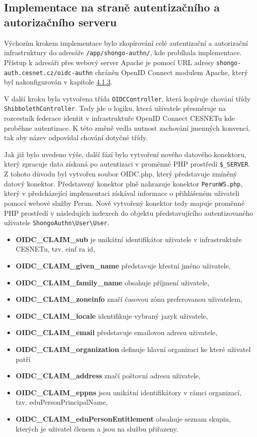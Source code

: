 \documentclass[
  printed, %
  twoside, %
  table,   %
  nolof,     %
  nolot,     %
]{fithesis3}
\begin{document}
\subsection{Implementace na straně autentizačního a autorizačního serveru}
\label{ShongoImpl-authn}
Výchozím krokem implementace bylo zkopírování celé autentizační a autorizační infrastruktury do adresáře \texttt{/app/shongo-authn/}, kde probíhala implementace. Přístup k adresáři přes webový server Apache je pomocí URL adresy \texttt{shongo-auth.cesnet.cz/oidc-authn} chráněn OpenID Connect modulem Apache, který byl nakonfigurován v kapitole \hyperref[shongo-location]{4.1.3}.  \par

V další kroku byla vytvořena třída \texttt{OIDCController}, která kopíruje chování třídy \texttt{ShibbolethController}. Tedy jde o logiku, která uživatele přesměruje na rozcestník federace identit v infrastruktuře OpenID Connect CESNETu kde proběhne autentizace. K této změně vedla nutnost zachování jmenných konvencí, tak aby název odpovídal chování dotyčné třídy.  \par 

Jak již bylo uvedeno výše, další fází bylo vytvoření nového datového konektoru, který zpracuje data získaná po autentizaci v proměnné PHP prostředí \texttt{\$\_SERVER}. Z tohoto důvodu byl vytvořen soubor OIDC.php, který představuje zmíněný datový konektor. Představený konektor plně nahrazuje konektor \texttt{PerunWS.php}, který v předcházející implementaci získával informace o přihlášeném uživateli pomocí webové služby Perun. Nově vytvořený konektor tedy mapuje proměnné PHP prostředí v následujích indexech do objektu představujícího autentizovaného uživatele \texttt{ShongoAuthn\textbackslash User\textbackslash User}. 

\begin{itemize}
    \item \textbf{OIDC\_CLAIM\_sub} je unikátní identifikátor uživatele v infrastruktuře CESNETu, tzv. einf   ra id,
    \item \textbf{OIDC\_CLAIM\_given\_name} představuje křestní jméno uživatele,
    \item \textbf{OIDC\_CLAIM\_family\_name} obsahuje příjmení uživatele,
    \item \textbf{OIDC\_CLAIM\_zoneinfo} značí časovou zónu preferovanou uživatelem, 
    \item \textbf{OIDC\_CLAIM\_locale} identifikuje vybraný jazyk uživatele,
    \item \textbf{OIDC\_CLAIM\_email} představuje emailovou adresu uživatele,
    \item \textbf{OIDC\_CLAIM\_organization} definuje hlavní organizaci ke které uživatel patří
    \item \textbf{OIDC\_CLAIM\_address} značí poštovní adresu uživatele,
    \item \textbf{OIDC\_CLAIM\_eppns} jsou unikátní identifikátory v rámci organizací, tzv. eduPersonPrincipalName, 
    \item \textbf{OIDC\_CLAIM\_eduPersonEntitlement} obsahuje seznam skupin, kterých je uživatel členem a jsou na službu přiřazeny. 
\end{itemize}
\end{document}
